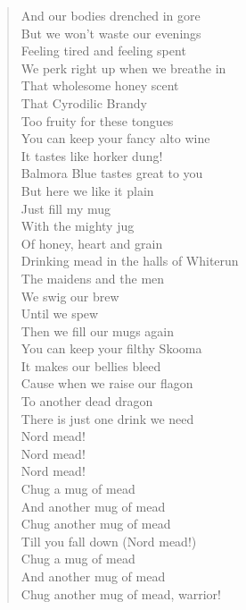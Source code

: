 \documentclass[11pt]{article}
\begin{document}
\begin{verse}
And our bodies drenched in gore\\
But we won't waste our evenings\\
Feeling tired and feeling spent\\
We perk right up when we breathe in\\
That wholesome honey scent\\
\vspace*{1em}
That Cyrodilic Brandy\\
Too fruity for these tongues\\
You can keep your fancy alto wine\\
It tastes like horker dung!\\
\vspace*{1em}
Balmora Blue tastes great to you\\
But here we like it plain\\
Just fill my mug\\
With the mighty jug\\
Of honey, heart and grain\\
\vspace*{1em}
Drinking mead in the halls of Whiterun\\
The maidens and the men\\
We swig our brew\\
Until we spew\\
Then we fill our mugs again\\
\vspace*{1em}
You can keep your filthy Skooma\\
It makes our bellies bleed\\
Cause when we raise our flagon\\
To another dead dragon\\
There is just one drink we need\\
Nord mead!\\
Nord mead!\\
Nord mead!\\
Chug a mug of mead\\
And another mug of mead\\
Chug another mug of mead\\
Till you fall down (Nord mead!)\\
Chug a mug of mead\\
And another mug of mead\\
Chug another mug of mead, warrior!\\
\end{verse}
\clearpage
\end{document}
